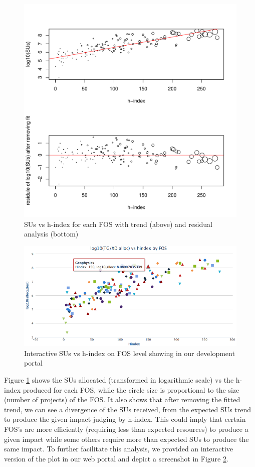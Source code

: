 \documentclass{tex/sig-alternate}
\begin{document}
\begin{figure}[!htb] 
  \centering 
    \includegraphics[width=1.0\columnwidth]{images/05_alloc_vs_hindex_fos_sized_2in1.pdf} 
  \caption{SUs vs h-index for each FOS with trend (above) and residual analysis (bottom)}\label{F:alloc-vs-hindex-fos-sized} 
\end{figure} 
 
\begin{figure}[!htb] 
  \centering 
    \includegraphics[width=1.0\columnwidth]{images/fos_interact_portal.png} 
  \caption{Interactive SUs vs h-index on FOS level showing in our development portal}\label{F:fig3} 
\end{figure} 
 
Figure \ref{F:alloc-vs-hindex-fos-sized} shows the SUs allocated (transformed in logarithmic scale) vs the h-index produced for each FOS, while the circle size is proportional to the size (number of projects) of the FOS. It also shows that after removing the fitted trend, we can see a divergence of the SUs received, from the expected SUs trend to produce the given impact judging by h-index. This could imply that certain FOS's are more efficiently (requiring less than expected resources) to produce a given impact while some others require more than expected SUs to produce the same impact. To further facilitate this analysis, we provided an interactive version of the plot in our web portal \cite{www-tasdeviu} and depict a screenshot in Figure \ref{F:fig3}.
\end{document}
